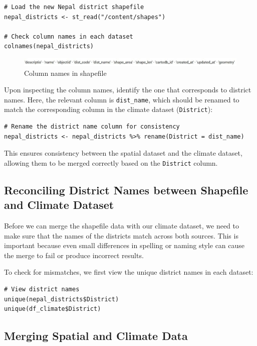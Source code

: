 \begin{verbatim}
# Load the new Nepal district shapefile
nepal_districts <- st_read("/content/shapes")

# Check column names in each dataset
colnames(nepal_districts)
\end{verbatim}

\begin{figure}[h]
\centering
\includegraphics[width=1.02\textwidth]{figures/column_names.jpg}
\caption{Column names in shapefile}
\label{fig:shapefile_columns}
\end{figure}

Upon inspecting the column names, identify the one that corresponds to district names. Here, the relevant column is \texttt{dist\_name}, which should be renamed to match the corresponding column in the climate dataset (\texttt{District}):

\begin{verbatim}
# Rename the district name column for consistency
nepal_districts <- nepal_districts %>% rename(District = dist_name)
\end{verbatim}

This ensures consistency between the spatial dataset and the climate dataset, allowing them to be merged correctly based on the \texttt{District} column.

\subsection*{Reconciling District Names between Shapefile and Climate Dataset}

Before we can merge the shapefile data with our climate dataset, we need to make sure that the names of the districts match across both sources. This is important because even small differences in spelling or naming style can cause the merge to fail or produce incorrect results.

To check for mismatches, we first view the unique district names in each dataset:

\begin{verbatim}
# View district names
unique(nepal_districts$District)
unique(df_climate$District)

\end{verbatim}


\subsection*{Merging Spatial and Climate Data}

